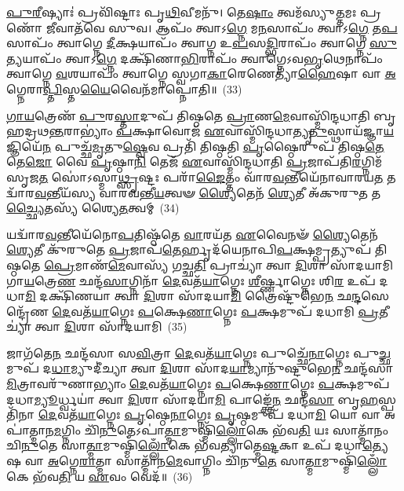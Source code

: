 \-\ul{𑌪𑍁}\-\-\ul{𑌰𑍀}\-𑌷𑍍𑌯𑌾𑌃॑ 𑌪𑍍𑌰𑌵𑌿᳴𑌷𑍍𑌟𑌾𑌃 𑌪𑍃\-\ul{𑌥𑌿}\-𑌵𑍀𑌮𑌨𑍁᳴। 𑌤𑍇\-\ul{𑌷𑌾𑌂} 𑌤𑍍𑌵𑌮᳴𑌸𑍍𑌯𑍁\-\ul{𑌤𑍍𑌤}\-𑌮𑌃 𑌪𑍍𑌰 𑌣𑍋᳴ \ul{𑌜𑍀}\-𑌵𑌾𑌤᳴𑌵𑍇 𑌸𑍁𑌵। 𑌆𑌪𑌂᳴ 𑌤𑍍𑌵𑌾𑌽\-\ul{𑌗𑍍𑌨𑍇} 𑌮\-\ul{𑌨}\-𑌸𑌾𑌪𑌂᳴ 𑌤𑍍𑌵𑌾𑌽\-\ul{𑌗𑍍𑌨𑍇} 𑌤\-\ul{𑌪}\-𑌸𑌾𑌪𑌂᳴ 𑌤𑍍𑌵𑌾𑌗𑍍𑌨𑍇 \ul{𑌦𑍀}\-𑌕𑍍𑌷𑌯𑌾𑌪𑌂᳴ 𑌤𑍍𑌵𑌾𑌗𑍍𑌨 𑌉\-\ul{𑌪}\-𑌸\-\ul{𑌦𑍍𑌭𑌿}\-𑌰𑌾𑌪𑌂᳴ 𑌤𑍍𑌵𑌾𑌗𑍍𑌨𑍇 \ul{𑌸𑍁}\-𑌤𑍍𑌯𑌯𑌾𑌪𑌂᳴ 𑌤𑍍𑌵𑌾𑌽\-\ul{𑌗𑍍𑌨𑍇} 𑌦𑌕𑍍𑌷𑌿᳴𑌣𑌾\-\ul{𑌭𑌿}\-𑌰𑌾𑌪𑌂᳴ 𑌤𑍍𑌵𑌾𑌗𑍍𑌨𑍇\-𑌽𑌵\-\ul{𑌭𑍃}\-𑌥𑍇𑌨𑌾𑌪𑌂᳴ 𑌤𑍍𑌵𑌾𑌗𑍍𑌨𑍇 \ul{𑌵}\-𑌶𑌯𑌾𑌪𑌂᳴ 𑌤𑍍𑌵𑌾𑌗𑍍𑌨𑍇 𑌸𑍍𑌵𑌗𑌾\-\ul{𑌕𑌾}\-𑌰𑍇𑌣𑍇𑌤𑍍𑌯𑌾᳴\-\ul{𑌹𑍈}\-𑌷𑌾 𑌵𑌾 \ul{𑌅}\-𑌗𑍍𑌨𑍇𑌰𑌾\-\ul{𑌪𑍍𑌤𑌿}\-𑌸𑍍𑌤\-\ul{𑌯𑍈}\-𑌵𑍈𑌨᳴𑌮𑌾𑌪𑍍𑌨𑍋𑌤𑌿॥~(33)

{\anuvakamend[{\-\ul{𑌐}\-\-\ul{𑌨𑍍𑌦𑍍𑌰𑌿}\-𑌯𑌾 \ul{𑌪𑍁}\-𑌰 𑌉᳴\-\ul{𑌤𑍍𑌤}\-𑌰𑌾𑌦𑍍𑌧\-\ul{𑌨𑍁}\-𑌸𑍍𑌤\-\ul{𑌦}\-𑌗𑍍𑌨𑌯᳴ 𑌆\-\ul{𑌹𑌾}\-𑌷𑍍𑌟𑍗 𑌚᳴}]}%

\-\ul{𑌗𑌾}\-\-\ul{𑌯}\-𑌤𑍍𑌰𑍇𑌣᳴ \ul{𑌪𑍁}\-𑌰\-\ul{𑌸𑍍𑌤𑌾}\-𑌦𑍁𑌪᳴ 𑌤𑌿𑌷𑍍𑌠𑌤𑍇 \ul{𑌪𑍍𑌰𑌾}\-𑌣\-\ul{𑌮𑍇}\-𑌵𑌾𑌸𑍍𑌮𑌿᳴𑌨𑍍𑌦𑌧𑌾𑌤𑌿 𑌬𑍃𑌹𑌦𑍍𑌰𑌥\-\ul{𑌨𑍍𑌤}\-𑌰𑌾\-𑌭𑍍𑌯𑌾𑌂॑ \ul{𑌪}\-𑌕𑍍𑌷𑌾𑌵𑍋𑌜᳴ \ul{𑌏}\-𑌵𑌾𑌸𑍍𑌮𑌿᳴𑌨𑍍𑌦𑌧𑌾𑌤𑍍𑌯𑍃\-\ul{𑌤𑍁}\-𑌸𑍍𑌥𑌾𑌯᳴𑌜𑍍𑌞𑌾\-\ul{𑌯}\-𑌜𑍍𑌞𑌿𑌯𑍇᳴\-\ul{𑌨} 𑌪𑍁𑌚𑍍𑌛᳴\-\ul{𑌮𑍃}\-𑌤𑍁\-\ul{𑌷𑍍𑌵𑍇}\-𑌵 𑌪𑍍𑌰𑌤𑌿᳴ 𑌤𑌿𑌷𑍍𑌠𑌤𑌿 \ul{𑌪𑍃}\-𑌷𑍍𑌠𑍈𑌰𑍁𑌪᳴ 𑌤𑌿𑌷𑍍𑌠\-\ul{𑌤𑍇} 𑌤𑍇\-\ul{𑌜𑍋} 𑌵𑍈 \ul{𑌪𑍃}\-𑌷𑍍𑌠𑌾\-\ul{𑌨𑌿} 𑌤𑍇𑌜᳴ \ul{𑌏}\-𑌵𑌾𑌸𑍍𑌮𑌿᳴𑌨𑍍𑌦𑌧𑌾𑌤𑌿 \ul{𑌪𑍍𑌰}\-𑌜𑌾𑌪᳴𑌤𑌿\-\ul{𑌰}\-𑌗𑍍𑌨𑌿𑌮᳴𑌸𑍃𑌜\-\ul{𑌤} 𑌸𑍋॑\-𑌽𑌸𑍍𑌮𑌾\-\ul{𑌥𑍍𑌸𑍃}\-𑌷𑍍𑌟𑌃 𑌪𑌰𑌾᳴\-\ul{𑌙𑍈}\-𑌤𑍍𑌤𑌂 𑌵𑌾᳴𑌰\-\ul{𑌵}\-𑌨𑍍𑌤𑍀𑌯𑍇᳴𑌨𑌾𑌵𑌾𑌰𑌯\-\ul{𑌤} 𑌤𑌦𑍍𑌵𑌾᳴𑌰\-\ul{𑌵}\-𑌨𑍍𑌤𑍀𑌯᳴𑌸𑍍𑌯 𑌵𑌾𑌰𑌵𑌨𑍍𑌤𑍀\-\ul{𑌯}\-𑌤𑍍𑌵𑍟 \ul{𑌶𑍍𑌯𑍈}\-𑌤𑍇𑌨᳴ \ul{𑌶𑍍𑌯𑍇}\-𑌤𑍀 𑌅᳴𑌕𑍁𑌰𑍁\-\ul{𑌤} 𑌤\-\ul{𑌚𑍍𑌛𑍍𑌯𑍈}\-𑌤𑌸𑍍𑌯᳴ 𑌶𑍍𑌯𑍈\-\ul{𑌤}\-𑌤𑍍𑌵𑌮𑍍~(34)

𑌯𑌦𑍍𑌵𑌾᳴𑌰\-\ul{𑌵}\-𑌨𑍍𑌤𑍀𑌯𑍇᳴𑌨𑍋\-\ul{𑌪}\-𑌤𑌿𑌷𑍍𑌠᳴𑌤𑍇 \ul{𑌵𑌾}\-𑌰𑌯᳴𑌤 \ul{𑌏}\-𑌵𑍈𑌨𑍟᳴ \ul{𑌶𑍍𑌯𑍈}\-𑌤𑍇𑌨᳴ \ul{𑌶𑍍𑌯𑍇}\-𑌤𑍀 𑌕𑍁᳴𑌰𑍁𑌤𑍇 \ul{𑌪𑍍𑌰}\-𑌜𑌾𑌪᳴\-\ul{𑌤𑍇}\-𑌰𑍍\mbox{}𑌹𑍃𑌦᳴𑌯𑍇𑌨𑌾𑌪𑌿\-\ul{𑌪}\-𑌕𑍍𑌷𑌮𑍍𑌪𑍍𑌰𑌤𑍍𑌯𑍁𑌪᳴ 𑌤𑌿𑌷𑍍𑌠𑌤𑍇 \ul{𑌪𑍍𑌰𑍇}\-𑌮𑌾𑌣᳴\-\ul{𑌮𑍇}\-𑌵𑌾𑌸𑍍𑌯᳴ 𑌗𑌚𑍍𑌛\-\ul{𑌤𑌿} 𑌪𑍍𑌰𑌾𑌚𑍍𑌯𑌾॑ 𑌤𑍍𑌵𑌾 \ul{𑌦𑌿}\-𑌶𑌾 𑌸𑌾᳴𑌦𑌯𑌾𑌮𑌿 𑌗𑌾\-\ul{𑌯}\-𑌤𑍍𑌰𑍇\-\ul{𑌣} 𑌛𑌨𑍍𑌦᳴\-\ul{𑌸𑌾}\-𑌗𑍍𑌨𑌿𑌨𑌾᳴ \ul{𑌦𑍇}\-𑌵𑌤᳴\-\ul{𑌯𑌾}\-𑌗𑍍𑌨𑍇𑌃 \ul{𑌶𑍀}\-𑌰𑍍𑌷𑍍𑌣𑌾𑌗𑍍𑌨𑍇𑌃 𑌶𑌿\-\ul{𑌰} 𑌉𑌪᳴ 𑌦𑌧𑌾\-\ul{𑌮𑌿} 𑌦𑌕𑍍𑌷𑌿᳴𑌣𑌯𑌾 𑌤𑍍𑌵𑌾 \ul{𑌦𑌿}\-𑌶𑌾 𑌸𑌾᳴𑌦𑌯𑌾\-\ul{𑌮𑌿} 𑌤𑍍𑌰𑍈𑌷𑍍𑌟𑍁᳴𑌭𑍇\-\ul{𑌨} 𑌛\-\ul{𑌨𑍍𑌦}\-𑌸𑍇𑌨𑍍𑌦𑍍𑌰𑍇᳴𑌣 \ul{𑌦𑍇}\-𑌵𑌤᳴\-\ul{𑌯𑌾}\-𑌗𑍍𑌨𑍇𑌃 \ul{𑌪}\-𑌕𑍍𑌷𑍇\-\ul{𑌣𑌾}\-𑌗𑍍𑌨𑍇𑌃 \ul{𑌪}\-𑌕𑍍𑌷𑌮𑍁𑌪᳴ 𑌦𑌧𑌾𑌮𑌿 \ul{𑌪𑍍𑌰}\-𑌤𑍀𑌚𑍍𑌯𑌾॑ 𑌤𑍍𑌵𑌾 \ul{𑌦𑌿}\-𑌶𑌾 𑌸𑌾᳴𑌦𑌯𑌾𑌮𑌿~(35)

𑌜𑌾𑌗᳴𑌤𑍇\-\ul{𑌨} 𑌛𑌨𑍍𑌦᳴𑌸𑌾 𑌸\-\ul{𑌵𑌿}\-𑌤𑍍𑌰𑌾 \ul{𑌦𑍇}\-𑌵𑌤᳴\-\ul{𑌯𑌾}\-𑌗𑍍𑌨𑍇𑌃 𑌪𑍁𑌚𑍍𑌛𑍇᳴\-\ul{𑌨𑌾}\-𑌗𑍍𑌨𑍇𑌃 𑌪𑍁\-\ul{𑌚𑍍𑌛}\-𑌮𑍁𑌪᳴ 𑌦\-\ul{𑌧𑌾}\-𑌮𑍍𑌯𑍁𑌦𑍀॑𑌚𑍍𑌯𑌾 𑌤𑍍𑌵𑌾 \ul{𑌦𑌿}\-𑌶𑌾 𑌸𑌾᳴𑌦\-\ul{𑌯𑌾}\-𑌮𑍍𑌯𑌾𑌨𑍁᳴𑌷𑍍𑌟𑍁𑌭𑍇\-\ul{𑌨} 𑌛𑌨𑍍𑌦᳴𑌸𑌾 \ul{𑌮𑌿}\-𑌤𑍍𑌰𑌾𑌵𑌰𑍁᳴𑌣𑌾𑌭𑍍𑌯𑌾𑌂 \ul{𑌦𑍇}\-𑌵𑌤᳴\-\ul{𑌯𑌾}\-𑌗𑍍𑌨𑍇𑌃 \ul{𑌪}\-𑌕𑍍𑌷𑍇\-\ul{𑌣𑌾}\-𑌗𑍍𑌨𑍇𑌃 \ul{𑌪}\-𑌕𑍍𑌷𑌮𑍁𑌪᳴ 𑌦𑌧𑌾\-\ul{𑌮𑍍𑌯𑍂}\-𑌰𑍍𑌧𑍍𑌵𑌯𑌾॑ 𑌤𑍍𑌵𑌾 \ul{𑌦𑌿}\-𑌶𑌾 𑌸𑌾᳴𑌦𑌯𑌾\-\ul{𑌮𑌿} 𑌪𑌾𑌙𑍍𑌕𑍍𑌤𑍇᳴\-\ul{𑌨} 𑌛𑌨𑍍𑌦᳴\-\ul{𑌸𑌾} 𑌬𑍃\-\ul{𑌹}\-𑌸𑍍𑌪𑌤𑌿᳴𑌨𑌾 \ul{𑌦𑍇}\-𑌵𑌤᳴\-\ul{𑌯𑌾}\-𑌗𑍍𑌨𑍇𑌃 \ul{𑌪𑍃}\-𑌷𑍍𑌠𑍇\-\ul{𑌨𑌾}\-𑌗𑍍𑌨𑍇𑌃 \ul{𑌪𑍃}\-𑌷𑍍𑌠𑌮𑍁𑌪᳴ 𑌦𑌧𑌾\-\ul{𑌮𑌿} 𑌯𑍋 𑌵𑌾 𑌅𑌪𑌾॑𑌤𑍍𑌮𑌾𑌨\-\ul{𑌮}\-𑌗𑍍𑌨𑌿𑌂 𑌚𑌿᳴\-\ul{𑌨𑍁}\-𑌤𑍇\-𑌽𑌪𑌾॑\-\ul{𑌤𑍍𑌮𑌾}\-𑌮𑍁𑌷𑍍𑌮𑌿᳴\-\ul{𑌲𑍍𑌲𑍋𑌁}\-𑌕𑍇 𑌭᳴𑌵\-\ul{𑌤𑌿} 𑌯𑌃 𑌸𑌾𑌤𑍍𑌮𑌾᳴𑌨𑌂 𑌚𑌿\-\ul{𑌨𑍁}\-𑌤𑍇 𑌸𑌾\-\ul{𑌤𑍍𑌮𑌾}\-𑌮𑍁𑌷𑍍𑌮𑌿᳴\-\ul{𑌲𑍍𑌲𑍋𑌁}\-𑌕𑍇 𑌭᳴𑌵𑌤𑍍𑌯𑌾𑌤𑍍𑌮𑍇\-\ul{𑌷𑍍𑌟}\-𑌕𑌾 𑌉𑌪᳴ 𑌦𑌧𑌾\-\ul{𑌤𑍍𑌯𑍇}\-𑌷 𑌵𑌾 \ul{𑌅}\-𑌗𑍍𑌨𑍇\-\ul{𑌰𑌾}\-𑌤𑍍𑌮𑌾 𑌸𑌾𑌤𑍍𑌮𑌾᳴𑌨\-\ul{𑌮𑍇}\-𑌵𑌾𑌗𑍍𑌨𑌿𑌂 𑌚𑌿᳴𑌨𑍁\-\ul{𑌤𑍇} 𑌸𑌾\-\ul{𑌤𑍍𑌮𑌾}\-𑌮𑍁𑌷𑍍𑌮𑌿᳴\-\ul{𑌲𑍍𑌲𑍋𑌁}\-𑌕𑍇 𑌭᳴𑌵\-\ul{𑌤𑌿} 𑌯 \ul{𑌏}\-𑌵𑌂 𑌵𑍇𑌦᳴॥~(36)

